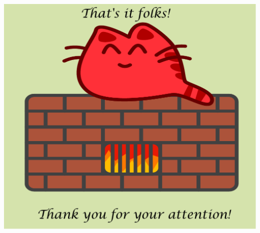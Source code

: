 \documentclass[xcolor=x11names,compress]{beamer}
\begin{document}
\begin{frame}

\begin{center}
\includegraphics[keepaspectratio, width=.8\textwidth]{template/happycat-end}
\end{center}
\end{frame}
\end{document}
